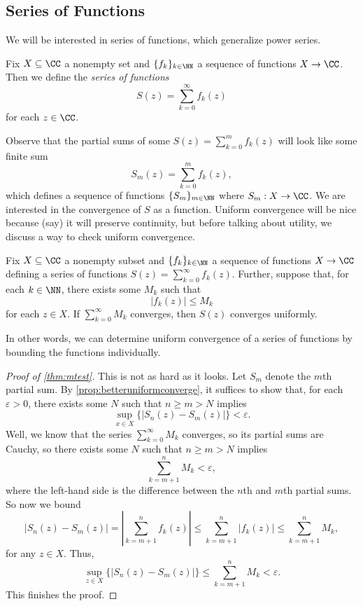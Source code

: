 \subsection{Series of Functions}
We will be interested in series of functions, which generalize power series.
\begin{definition}
	Fix $X\subseteq\CC$ a nonempty set and $\{f_k\}_{k\in\NN}$ a sequence of functions $X\to\CC$. Then we define the \textit{series of functions}
	\[S(z)=\sum_{k=0}^\infty f_k(z)\]
	for each $z\in\CC$.
\end{definition}
Observe that the partial sums of some $S(z)=\sum_{k=0}^mf_k(z)$ will look like some finite sum
\[S_m(z)=\sum_{k=0}^mf_k(z),\]
which defines a sequence of functions $\{S_m\}_{m\in\NN}$ where $S_m:X\to\CC$. We are interested in the convergence of $S$ as a function.
\convergedefi*
\noindent Uniform convergence will be nice because (say) it will preserve continuity, but before talking about utility, we discuss a way to check uniform convergence.
\begin{theorem} \label{thm:mtest}
	Fix $X\subseteq\CC$ a nonempty subset and $\{f_k\}_{k\in\NN}$ a sequence of functions $X\to\CC$ defining a series of functions $S(z)=\sum_{k=0}^\infty f_k(z)$. Further, suppose that, for each $k\in\NN$, there exists some $M_k$ such that
	\[|f_k(z)|\le M_k\]
	for each $z\in X$. If $\sum_{k=0}^\infty M_k$ converges, then $S(z)$ converges uniformly.
\end{theorem}
In other words, we can determine uniform convergence of a series of functions by bounding the functions individually.
\begin{proof}[Proof of \autoref{thm:mtest}]
	This is not as hard as it looks. Let $S_m$ denote the $m$th partial sum. By \autoref{prop:betteruniformconverge}, it suffices to show that, for each $\varepsilon>0$, there exists some $N$ such that $n\ge m>N$ implies
	\[\sup_{x\in X}\{|S_n(z)-S_m(z)|\}<\varepsilon.\]
	Well, we know that the series $\sum_{k=0}^\infty M_k$ converges, so its partial sums are Cauchy, so there exists some $N$ such that $n\ge m>N$ implies
	\[\sum_{k=m+1}^nM_k<\varepsilon,\]
	where the left-hand side is the difference between the $n$th and $m$th partial sums. So now we bound
	\[|S_n(z)-S_m(z)|=\left|\sum_{k=m+1}^nf_k(z)\right|\le\sum_{k=m+1}^n|f_k(z)|\le\sum_{k=m+1}^nM_k,\]
	for any $z\in X$. Thus,
	\[\sup_{z\in X}\{|S_n(z)-S_m(z)|\}\le\sum_{k=m+1}^nM_k<\varepsilon.\]
	This finishes the proof.
\end{proof}
